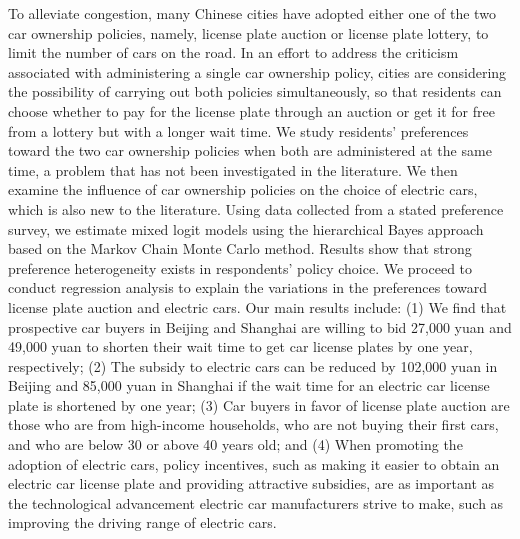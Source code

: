 To alleviate congestion, many Chinese cities have adopted either one of the two car ownership policies, namely, license plate auction or license plate lottery, to limit the number of cars on the road. In an effort to address the criticism associated with administering a single car ownership policy, cities are considering the possibility of carrying out both policies simultaneously, so that residents can choose whether to pay for the license plate through an auction or get it for free from a lottery but with a longer wait time. We study residents’ preferences toward the two car ownership policies when both are administered at the same time, a problem that has not been investigated in the literature. We then examine the influence of car ownership policies on the choice of electric cars, which is also new to the literature. Using data collected from a stated preference survey, we estimate mixed logit models using the hierarchical Bayes approach based on the Markov Chain Monte Carlo method. Results show that strong preference heterogeneity exists in respondents’ policy choice. We proceed to conduct regression analysis to explain the variations in the preferences toward license plate auction and electric cars. Our main results include: (1) We find that prospective car buyers in Beijing and Shanghai are willing to bid 27,000 yuan and 49,000 yuan to shorten their wait time to get car license plates by one year, respectively; (2) The subsidy to electric cars can be reduced by 102,000 yuan in Beijing and 85,000 yuan in Shanghai if the wait time for an electric car license plate is shortened by one year; (3) Car buyers in favor of license plate auction are those who are from high-income households, who are not buying their first cars, and who are below 30 or above 40 years old; and (4) When promoting the adoption of electric cars, policy incentives, such as making it easier to obtain an electric car license plate and providing attractive subsidies, are as important as the technological advancement electric car manufacturers strive to make, such as improving the driving range of electric cars.